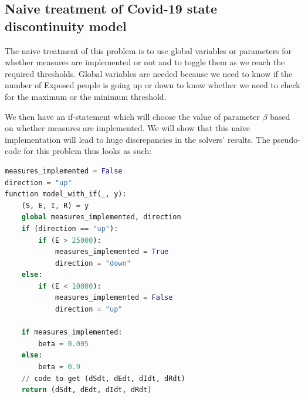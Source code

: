 \subsection{Naive treatment of Covid-19 state discontinuity model}
\label{subsection:naive_state_problem}
The naive treatment of this problem is to use global variables or parameters for whether measures are implemented or not and to toggle them as we reach the required thresholds. Global variables are needed because we need to know if the number of Exposed people is going up or down to know whether we need to check for the maximum or the minimum threshold.

We then have an if-statement which will choose the value of parameter $\beta$ based on whether measures are implemented. We will show that this naive implementation will lead to huge discrepancies in the solvers' results. The pseudo-code for this problem thus looks as such:

\begin{minipage}{\linewidth}
\begin{lstlisting}[language=Python]
measures_implemented = False
direction = "up"
function model_with_if(_, y):
    (S, E, I, R) = y
    global measures_implemented, direction
    if (direction == "up"):
        if (E > 25000):
            measures_implemented = True
            direction = "down"
    else:
        if (E < 10000):
            measures_implemented = False
            direction = "up"

    if measures_implemented:
        beta = 0.005 
    else:
        beta = 0.9
    // code to get (dSdt, dEdt, dIdt, dRdt)
    return (dSdt, dEdt, dIdt, dRdt)
\end{lstlisting}
\end{minipage}

